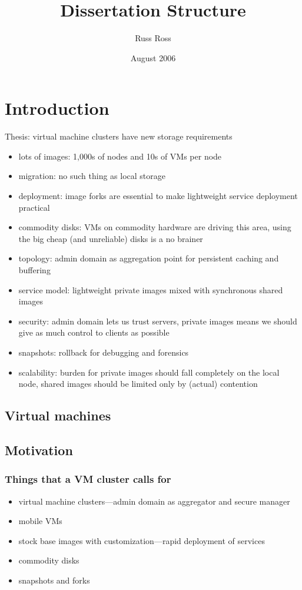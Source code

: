 \documentclass[a4paper]{article}
\title{Dissertation Structure}
\author{Russ Ross}
\date{August 2006}
\begin{document}
\maketitle

\section{Introduction}
Thesis: virtual machine clusters have new storage requirements
\begin{itemize}
\item lots of images: 1,000s of nodes and 10s of VMs per node
\item migration: no such thing as local storage
\item deployment: image forks are essential to make lightweight service deployment practical
\item commodity disks: VMs on commodity hardware are driving this area, using the big cheap (and unreliable) disks is a no brainer
\item topology: admin domain as aggregation point for persistent caching and buffering
\item service model: lightweight private images mixed with synchronous shared images
\item security: admin domain lets us trust servers, private images means we should give as much control to clients as possible
\item snapshots: rollback for debugging and forensics
\item scalability: burden for private images should fall completely on the local node, shared images should be limited only by (actual) contention
\end{itemize}

\subsection{Virtual machines}
\subsection{Motivation}
\subsubsection{Things that a VM cluster calls for}
\begin{itemize}
\item virtual machine clusters---admin domain as aggregator and secure manager
\item mobile VMs
\item stock base images with customization---rapid deployment of services
\item commodity disks
\item snapshots and forks
\end{itemize}
\end{document}
